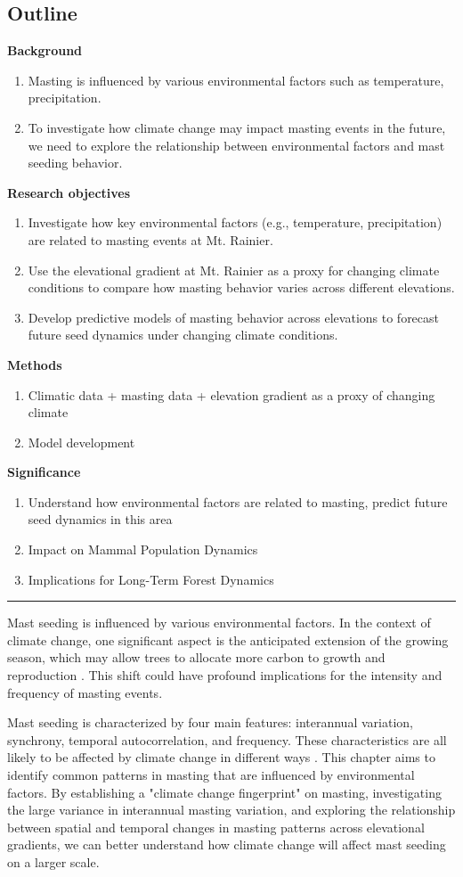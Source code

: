 \documentclass[11pt,letter]{article}
\begin{document}
\subsection{Outline}
\textbf{Background}
\begin{enumerate}
\item Masting is influenced by various environmental factors such as temperature, precipitation.
\item To investigate how climate change may impact masting events in the future, we need to explore the relationship between environmental factors and mast seeding behavior.
\end{enumerate}	
\textbf{Research objectives}
\begin{enumerate}
\item Investigate how key environmental factors (e.g., temperature, precipitation) are related to masting events at Mt. Rainier.
\item Use the elevational gradient at Mt. Rainier as a proxy for changing climate conditions to compare how masting behavior varies across different elevations.
\item Develop predictive models of masting behavior across elevations to forecast future seed dynamics under changing climate conditions.
\end{enumerate}
\textbf{Methods}
\begin{enumerate}
\item Climatic data + masting data + elevation gradient as a proxy of changing climate
\item Model development
\end{enumerate}
\textbf{Significance}
\begin{enumerate}
\item Understand how environmental factors are related to masting, predict future seed dynamics in this area
\item Impact on Mammal Population Dynamics
\item Implications for Long-Term Forest Dynamics
\end{enumerate}
\hrule

Mast seeding is influenced by various environmental factors. In the context of climate change, one significant aspect is the anticipated extension of the growing season, which may allow trees to allocate more carbon to growth and reproduction \citep{keenan2014net}. This shift could have profound implications for the intensity and frequency of masting events.

Mast seeding is characterized by four main features: interannual variation, synchrony, temporal autocorrelation, and frequency. These characteristics are all likely to be affected by climate change in different ways \citep{hacket2021climate}. This chapter aims to identify common patterns in masting that are influenced by environmental factors. By establishing a "climate change fingerprint" on masting, investigating the large variance in interannual masting variation, and exploring the relationship between spatial and temporal changes in masting patterns across elevational gradients, we can better understand how climate change will affect mast seeding on a larger scale.
\end{document}

